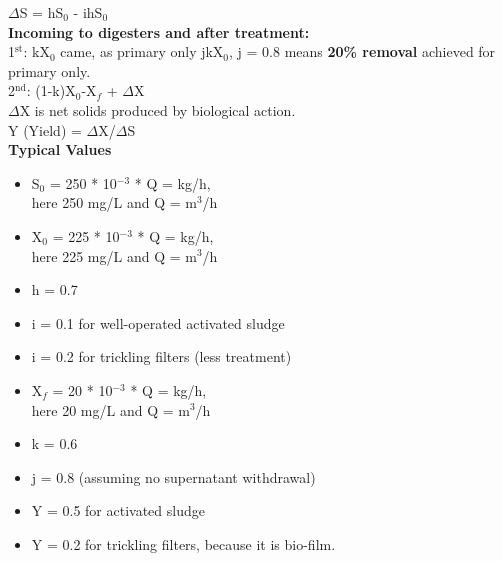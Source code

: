 \documentclass{article}
\numberwithin{equation}{section}
\begin{document}
$\Delta$S = hS$_0$ - ihS$_0$\\
\textbf{Incoming to digesters and after treatment:}\\
1$^{\text{st}}$: kX$_0$ came, as primary only jkX$_0$, j = 0.8 means \textbf{20\% removal} achieved for primary only.\\
2$^{\text{nd}}$: (1-k)X$_0$-X$_f$ + $\Delta$X\\
$\Delta$X is net solids produced by biological action.\\
Y (Yield) = $\Delta$X/$\Delta$S\\
\textbf{\large Typical Values}
\begin{itemize}
    \item S$_0$ = 250 * 10$^{-3}$ * Q = kg/h,\\
    here 250 mg/L and Q = m$^3$/h
    \item X$_0$ = 225 * 10$^{-3}$ * Q = kg/h,\\
    here 225 mg/L and Q = m$^3$/h
    \item h = 0.7
    \item i = 0.1 for well-operated activated sludge
    \item i = 0.2 for trickling filters (less treatment)
    \item X$_f$ = 20 * 10$^{-3}$ * Q = kg/h,\\
    here 20 mg/L and Q = m$^3$/h
    \item k = 0.6
    \item j = 0.8 (assuming no supernatant withdrawal)
    \item Y = 0.5 for activated sludge
    \item Y = 0.2 for trickling filters, because it is bio-film.
\end{itemize}
\end{document}
